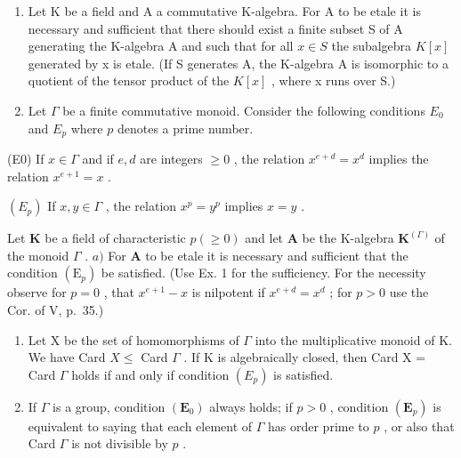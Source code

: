 \BourbakiExerciseGroup

\begin{enumerate}
\def\labelenumi{\arabic{enumi})}
\item
  Let K be a field and A a commutative K-algebra. For A to be etale it is necessary and sufficient that there should exist a finite subset S of A generating the K-algebra A and such that for all \(x \in S\) the subalgebra \(K[x]\) generated by x is etale. (If S generates A, the K-algebra A is isomorphic to a quotient of the tensor product of the \(K[x]\) , where x runs over S.)
\item
  Let \(\Gamma\) be a finite commutative monoid. Consider the following conditions \(E_0\) and \(E_p\) where \(p\) denotes a prime number.
\end{enumerate}

(E0) If \(x \in \Gamma\) and if \(e, d\) are integers \(\geqslant 0\) , the relation \(x^{e + d} = x^d\) implies the relation \(x^{e + 1} = x\) .

\((E_p)\) If \(x, y \in \Gamma\) , the relation \(x^p = y^p\) implies \(x = y\) .

Let \(\mathbf{K}\) be a field of characteristic \(p (\geqslant 0)\) and let \(\mathbf{A}\) be the K-algebra \(\mathbf{K}^{(\Gamma)}\) of the monoid \(\Gamma\) . \(a)\) For \(\mathbf{A}\) to be etale it is necessary and sufficient that the condition \((\mathrm{E}_p)\) be satisfied. (Use Ex. 1 for the sufficiency. For the necessity observe for \(p = 0\) , that \(x^{e+1} - x\) is nilpotent if \(x^{e+d} = x^d\) ; for \(p > 0\) use the Cor. of V, p.~35.)

\begin{enumerate}
\def\labelenumi{\alph{enumi})}
\setcounter{enumi}{1}
\item
  Let X be the set of homomorphisms of \(\Gamma\) into the multiplicative monoid of K. We have Card \(X \leqslant\) Card \(\Gamma\) . If K is algebraically closed, then Card X = Card \(\Gamma\) holds if and only if condition \((E_{p})\) is satisfied.
\item
  If \(\Gamma\) is a group, condition \((\mathbf{E}_0)\) always holds; if \(p > 0\) , condition \((\mathbf{E}_p)\) is equivalent to saying that each element of \(\Gamma\) has order prime to \(p\) , or also that Card \(\Gamma\) is not divisible by \(p\) .
\end{enumerate}

